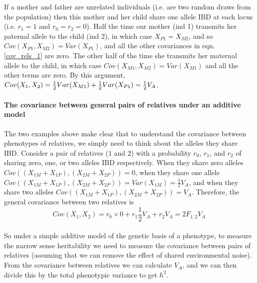 If a mother and father are unrelated individuals (i.e. are two
random draws from the population) then this mother and her child share
one allele IBD at each locus (i.e. $r_1=1$ and $r_0=r_2=0$). Half the
time our mother (ind 1) transmits her paternal allele to the child (ind 2), in which
case $X_{P1}=X_{M2}$, and so $Cov(X_{P1},X_{M2})=Var(X_{P1})$, and all
the other covariances in eqn. \ref{cov_rels_1} are zero. The other half of the time she transmits her maternal allele to the child, in which case
$Cov(X_{M1},X_{M2})=Var(X_{M1})$ and all the other terms are zero. By this
argument, $Cov(X_1,X_2) = \tfrac{1}{2} Var(X_{M1}) + \tfrac{1}{2} Var(X_{P1}) = \tfrac{1}{2}
V_A$. \\



\paragraph{The covariance between general pairs of relatives under an
additive model}


The two examples above make clear that to understand the covariance between
phenotypes of relatives, we simply need to think about the alleles they
share IBD. Consider a pair of relatives ($1$ and $2$) with a probability $r_0$,
$r_1$, and $r_2$ of sharing zero, one, or two alleles IBD
respectively. When they share zero alleles
$Cov((X_{1M}+X_{1P}),(X_{2M}+X_{2P}))=0$, when they share one allele
$Cov((X_{1M}+X_{1P}),(X_{2M}+X_{2P}))=
Var(X_{1M})=\frac{1}{2}V_A$, and when they share two alleles $Cov((X_{1M}+X_{1P}),(X_{2M}+X_{2P}))=
V_A$. Therefore, the general covariance between two
relatives is
\begin{equation}
Cov(X_1,X_2) = r_0 \times 0 + r_1 \frac{1}{2}V_A + r_2  V_A =
2 F_{1,2} V_A  \label{additive_covar_general_rellys}
\end{equation}\\
So under a simple additive model of the genetic basis of a phenotype,
to measure the narrow sense heritability we need to measure the
covariance between pairs of relatives (assuming that we can remove the effect of
shared environmental noise). From the covariance between relatives we
can calculate $V_A$, and we can then divide this by the total phenotypic
variance to get $h^2$. \\


